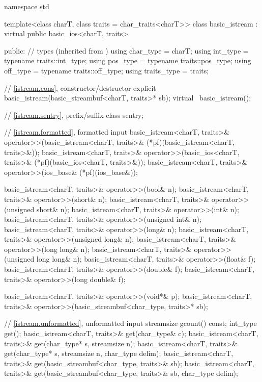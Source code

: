 %
\begin{codeblock}
namespace std {
  template<class charT, class traits = char_traits<charT>>
  class basic_istream : virtual public basic_ios<charT, traits> {
  public:
    // types (inherited from )
    using char_type   = charT;
    using int_type    = typename traits::int_type;
    using pos_type    = typename traits::pos_type;
    using off_type    = typename traits::off_type;
    using traits_type = traits;

    // \ref{istream.cons}, constructor/destructor
    explicit basic_istream(basic_streambuf<charT, traits>* sb);
    virtual ~basic_istream();

    // \ref{istream.sentry}, prefix/suffix
    class sentry;

    // \ref{istream.formatted}, formatted input
    basic_istream<charT, traits>&
      operator>>(basic_istream<charT, traits>& (*pf)(basic_istream<charT, traits>&));
    basic_istream<charT, traits>&
      operator>>(basic_ios<charT, traits>& (*pf)(basic_ios<charT, traits>&));
    basic_istream<charT, traits>&
      operator>>(ios_base& (*pf)(ios_base&));

    basic_istream<charT, traits>& operator>>(bool& n);
    basic_istream<charT, traits>& operator>>(short& n);
    basic_istream<charT, traits>& operator>>(unsigned short& n);
    basic_istream<charT, traits>& operator>>(int& n);
    basic_istream<charT, traits>& operator>>(unsigned int& n);
    basic_istream<charT, traits>& operator>>(long& n);
    basic_istream<charT, traits>& operator>>(unsigned long& n);
    basic_istream<charT, traits>& operator>>(long long& n);
    basic_istream<charT, traits>& operator>>(unsigned long long& n);
    basic_istream<charT, traits>& operator>>(float& f);
    basic_istream<charT, traits>& operator>>(double& f);
    basic_istream<charT, traits>& operator>>(long double& f);

    basic_istream<charT, traits>& operator>>(void*& p);
    basic_istream<charT, traits>& operator>>(basic_streambuf<char_type, traits>* sb);

    // \ref{istream.unformatted}, unformatted input
    streamsize gcount() const;
    int_type get();
    basic_istream<charT, traits>& get(char_type& c);
    basic_istream<charT, traits>& get(char_type* s, streamsize n);
    basic_istream<charT, traits>& get(char_type* s, streamsize n, char_type delim);
    basic_istream<charT, traits>& get(basic_streambuf<char_type, traits>& sb);
    basic_istream<charT, traits>& get(basic_streambuf<char_type, traits>& sb, char_type delim);

}}
\end{codeblock}
